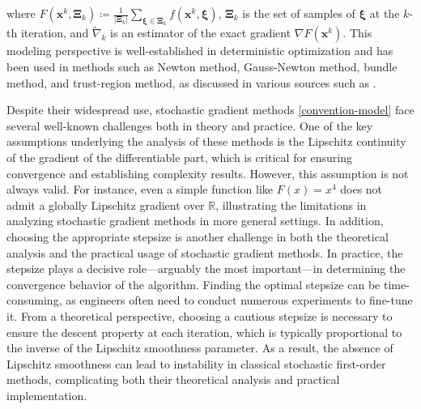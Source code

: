 \documentclass[twoside,11pt]{article}
\newcommand{\R}{\mathbb R}
\def\vx{{\bm{x}}}
\begin{document}
where $F(\vx^k,{\bm\Xi}_k)\coloneqq\frac{1}{|{\bm\Xi}_k|}\sum_{{\bm\xi}\in{\bm\Xi}_k}f(\vx^k,{\bm\xi})$, ${\bm\Xi_k}$ is the set of samples of ${\bm\xi}$ at the $k$-th iteration, and $\widetilde{\nabla}_k$ is an estimator of the exact gradient $\nabla F({\vx^k})$. This modeling perspective is well-established in deterministic optimization and has been used in methods such as Newton method, Gauss-Newton method, bundle method, and trust-region method, as discussed in various sources such as \citet{hiriart1993convex,nesterov2003introductory,lin2007trust,paren2022stochastic}.

Despite their widespread use, stochastic gradient methods \eqref{convention-model} face several well-known challenges both in theory and practice. One of the key assumptions underlying the analysis of these methods is the Lipschitz continuity of the gradient of the differentiable part, which is critical for ensuring convergence and establishing complexity results. However, this assumption is not always valid. For instance, even a simple function like $F(x)=x^4$ does not admit a globally Lipschitz gradient over $\R$, illustrating the limitations in analyzing stochastic gradient methods in more general settings. In addition, choosing the appropriate stepsize is another challenge in both the theoretical analysis and the practical usage of stochastic gradient methods. {In practice, the stepsize plays a decisive role—arguably the most important—in determining the convergence behavior of the algorithm. Finding the optimal stepsize can be time-consuming, as engineers often need to conduct numerous experiments to fine-tune it. From a theoretical perspective, choosing a cautious stepsize is necessary to ensure the descent property at each iteration, which is typically proportional to the inverse of the Lipschitz smoothness parameter. As a result, the absence of Lipschitz smoothness can lead to instability in classical stochastic first-order methods, complicating both their theoretical analysis and practical implementation.}
\end{document}
